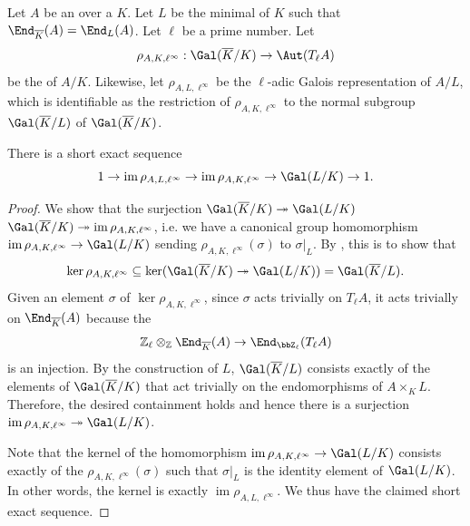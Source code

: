 \begin{proposition} \label{proposition:short_exact_sequence_of_galois_groups_for_extension_of_base_field_of_abelian_variety_that_gains_all_geometric_endomorphisms_yields_short_exact_sequence_of_ell_adic_tate_module}
    Let $A$ be an  over a  $K$. Let $L$ be the minimal  of $K$ such that $\End_{\overline{K}}(A) = \End_{L}(A)$.  Let $\ell$ be a prime number. Let
    $$\rho_{A,K,\ell^\infty}: \Gal(\overline{K}/K) \to \Aut(T_\ell A)$$ 
    be the  of $A/K$. Likewise, let $\rho_{A,L,\ell^\infty}$ be the $\ell$-adic Galois representation of $A/L$, which is identifiable as the restriction of $\rho_{A,K,\ell^\infty}$ to the normal subgroup $\Gal(\overline{K}/L)$ of $\Gal(\overline{K}/K)$. 

    There is a short exact sequence
    $$1 \to \operatorname{im} \rho_{A,L,\ell^\infty} \to \operatorname{im} \rho_{A,K,\ell^\infty} \to \Gal(L/K) \to 1.$$
\end{proposition}
\begin{proof}
    We show that the surjection $\Gal(\overline{K}/K) \twoheadrightarrow \Gal(L/K)$  $\Gal(\overline{K}/K) \twoheadrightarrow \operatorname{im} \rho_{A,K,\ell^\infty}$, i.e. we have a canonical group homomorphism $\operatorname{im} \rho_{A,K,\ell^\infty} \to \Gal(L/K)$ sending $\rho_{A,K,\ell^\infty}(\sigma)$ to $\sigma|_L$. By , this is to show that 
    $$\ker \rho_{A,K,\ell^\infty} \subseteq \ker(\Gal(\overline{K}/K) \twoheadrightarrow \Gal(L/K)) = \Gal(\overline{K}/L).$$
    Given an element $\sigma$ of $\ker \rho_{A,K,\ell^\infty}$, since $\sigma$ acts trivially on $T_\ell A$, it acts trivially on $\End_{\overline{K}}(A)$ because the  
    $$\mathbb{Z}_\ell \otimes_{\mathbb{Z}} \End_{\overline{K}}(A) \to \End_{\bbZ_\ell}(T_\ell A)$$
    is an injection. By the construction of $L$, $\Gal(\overline{K}/L)$ consists exactly of the elements of $\Gal(\overline{K}/K)$ that act trivially on the endomorphisms of $A \times_K L$. Therefore, the desired containment holds and hence there is a surjection $\operatorname{im} \rho_{A,K,\ell^\infty} \twoheadrightarrow \Gal(L/K)$.
    

    Note that the kernel of the homomorphism $\operatorname{im} \rho_{A,K,\ell^\infty} \to \Gal(L/K)$ consists exactly of the $\rho_{A,K,\ell^\infty}(\sigma)$ such that $\sigma|_L$ is the identity element of $\Gal(L/K)$. In other words, the kernel is exactly $\operatorname{im} \rho_{A,L,\ell^\infty}$. We thus have the claimed short exact sequence.
\end{proof}